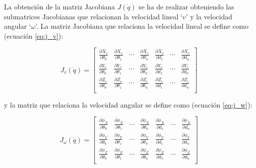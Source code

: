La obtención de la matriz Jacobiana $J\left(\dot{q}\right)$ se ha de realizar obteniendo
las submatrices Jacobianas que relacionan la velocidad lineal `$v$' y la velocidad angular
`$\omega$'. La matriz Jacobiana que relaciona la velocidad lineal se define como
(ecuación \ref{eq:j_v}):

\begin{equation}\label{eq:j_v}
    J_v\left(\dot{q}\right) =
    \begin{bmatrix}
        \frac{\partial X_e}{\partial \theta_0} & \frac{\partial X_e}{\partial \theta_1} & \cdots & \frac{\partial X_e}{\partial \theta_n} & \frac{\partial X_e}{\partial d_1} & \cdots & \frac{\partial X_e}{\partial d_n} \\[3ex]
        \frac{\partial Y_e}{\partial \theta_0} & \frac{\partial Y_e}{\partial \theta_1} & \cdots & \frac{\partial Y_e}{\partial \theta_n} & \frac{\partial Y_e}{\partial d_1} & \cdots & \frac{\partial Y_e}{\partial d_n} \\[3ex]
        \frac{\partial Z_e}{\partial \theta_0} & \frac{\partial Z_e}{\partial \theta_1} & \cdots & \frac{\partial Z_e}{\partial \theta_n} & \frac{\partial Z_e}{\partial d_1} & \cdots & \frac{\partial Z_e}{\partial d_n} \\
    \end{bmatrix}
\end{equation}

y la matriz que relaciona la velocidad angular se define como (ecuación \ref{eq:j_w}):

\begin{equation}\label{eq:j_w}
    J_{\omega}\left(\dot{q}\right) =
    \begin{bmatrix}
        \frac{\partial \phi_X}{\partial \theta_0} & \frac{\partial \phi_X}{\partial \theta_1} & \cdots & \frac{\partial \phi_X}{\partial \theta_n} & \frac{\partial \phi_X}{\partial d_1} & \cdots & \frac{\partial \phi_X}{\partial d_n} \\[3ex]
        \frac{\partial \phi_Y}{\partial \theta_0} & \frac{\partial \phi_Y}{\partial \theta_1} & \cdots & \frac{\partial \phi_Y}{\partial \theta_n} & \frac{\partial \phi_Y}{\partial d_1} & \cdots & \frac{\partial \phi_Y}{\partial d_n} \\[3ex]
        \frac{\partial \phi_Z}{\partial \theta_0} & \frac{\partial \phi_Z}{\partial \theta_1} & \cdots & \frac{\partial \phi_Z}{\partial \theta_n} & \frac{\partial \phi_Z}{\partial d_1} & \cdots & \frac{\partial \phi_Z}{\partial d_n} \\
    \end{bmatrix}
\end{equation}

